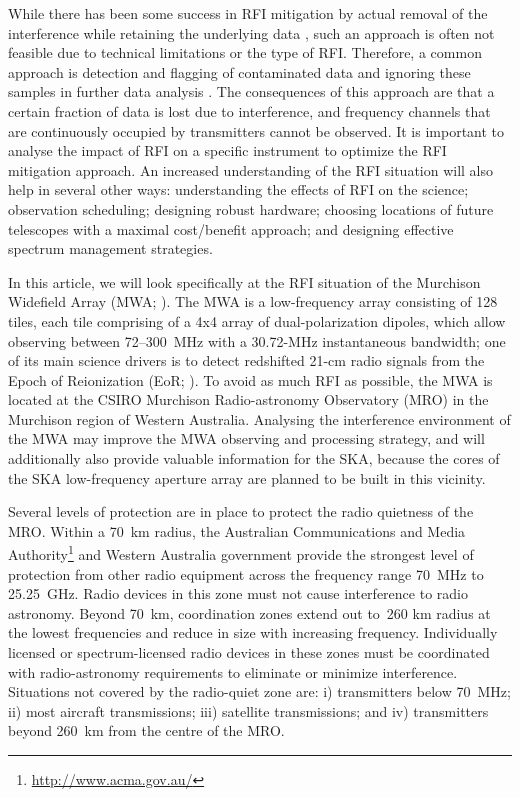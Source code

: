\documentclass{pasa}
\begin{document}
While there has been some success in RFI mitigation by actual removal of the interference while retaining the underlying data \citep{spatial-filtering-parkes-multibeam-for-pulses,rfi-spatial-processing-hellbourg-2014}, such an approach is often not feasible due to technical limitations or the type of RFI. Therefore, a common approach is detection and flagging of contaminated data and ignoring these samples in further data analysis \citep{statistical-rfi-removal,pieflag-middelberg-2006,post-correlation-rfi-classification,prasad-flagcal-2012,serpent-peck-2013}. The consequences of this approach are that a certain fraction of data is lost due to interference, and frequency channels that are continuously occupied by transmitters cannot be observed. It is important to analyse the impact of RFI on a specific instrument to optimize the RFI mitigation approach. An increased understanding of the RFI situation will also help in several other ways: understanding the effects of RFI on the science; observation scheduling; designing robust hardware; choosing locations of future telescopes with a maximal cost/benefit approach; and designing effective spectrum management strategies.

In this article, we will look specifically at the RFI situation of the Murchison Widefield Array (MWA; \citealt{mwa-design-2009,mwa}). The MWA is a low-frequency array consisting of 128 tiles, each tile comprising of a 4x4 array of dual-polarization dipoles, which allow observing between 72--300~MHz with a 30.72-MHz instantaneous bandwidth; one of its main science drivers is to detect redshifted 21-cm radio signals from the Epoch of Reionization (EoR; \citealt{bowman-science-with-the-mwa-2013}). To avoid as much RFI as possible, the MWA is located at the CSIRO Murchison Radio-astronomy Observatory (MRO) in the Murchison region of Western Australia. Analysing the interference environment of the MWA may improve the MWA observing and processing strategy, and will additionally also provide valuable information for the SKA, because the cores of the SKA low-frequency aperture array are planned to be built in this vicinity.

Several levels of protection are in place to protect the radio quietness of the MRO. Within a 70~km radius, the Australian Communications and Media Authority\footnote{\url{http://www.acma.gov.au/}} and Western Australia government provide the strongest level of protection from other radio equipment across the frequency range 70~MHz to 25.25~GHz. Radio devices in this zone must not cause interference to radio astronomy.  Beyond 70~km, coordination zones extend out to~260 km radius at the lowest frequencies and reduce in size with increasing frequency. Individually licensed or spectrum-licensed radio devices in these zones must be coordinated with radio-astronomy requirements to eliminate or minimize interference. Situations not covered by the radio-quiet zone are: i) transmitters below 70~MHz; ii) most aircraft transmissions; iii) satellite transmissions; and iv) transmitters beyond 260~km from the centre of the MRO.
\end{document}
